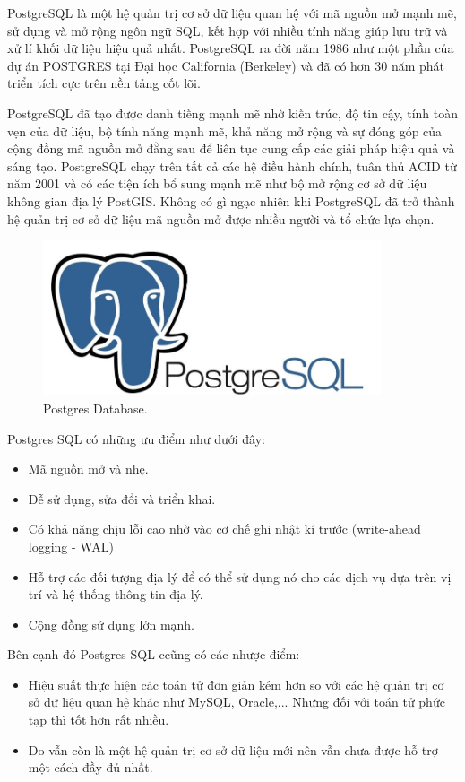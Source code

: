 PostgreSQL là một hệ quản trị cơ sở dữ liệu quan hệ với mã nguồn mở mạnh mẽ, sử dụng và mở rộng ngôn ngữ SQL, kết hợp với nhiều tính năng giúp lưu trữ và xử lí khối dữ liệu hiệu quả nhất. PostgreSQL ra đời năm 1986 như một phần của dự án POSTGRES tại Đại học California (Berkeley) và đã có hơn 30 năm phát triển tích cực trên nền tảng cốt lõi.\par

PostgreSQL đã tạo được danh tiếng mạnh mẽ nhờ kiến trúc, độ tin cậy, tính toàn vẹn của dữ liệu, bộ tính năng mạnh mẽ, khả năng mở rộng và sự đóng góp của cộng đồng mã nguồn mở đằng sau để liên tục cung cấp các giải pháp hiệu quả và sáng tạo. PostgreSQL chạy trên tất cả các hệ điều hành chính, tuân thủ ACID từ năm 2001 và có các tiện ích bổ sung mạnh mẽ như bộ mở rộng cơ sở dữ liệu không gian địa lý PostGIS. Không có gì ngạc nhiên khi PostgreSQL đã trở thành hệ quản trị cơ sở dữ liệu mã nguồn mở được nhiều người và tổ chức lựa chọn.\par

 \begin{figure}[h!]
    \begin{center}
        \includegraphics[width=10cm]{Image/Technical/postgresql.png}
        \caption{Postgres Database.}
        \label{postgres}
    \end{center}
\end{figure}

\par
Postgres SQL có những ưu điểm như dưới đây:
\begin{itemize}
    \item Mã nguồn mở và nhẹ.
    \item Dễ sử dụng, sửa đổi và triển khai.
    \item Có khả năng chịu lỗi cao nhờ vào cơ chế ghi nhật kí trước (write-ahead logging - WAL)
    \item Hỗ trợ các đối tượng địa lý để có thể sử dụng nó cho các dịch vụ dựa trên vị trí và hệ thống thông tin địa lý.
    \item Cộng đồng sử dụng lớn mạnh.
\end{itemize}
Bên cạnh đó Postgres SQL ccũng có các nhược điểm:
\begin{itemize}
    \item Hiệu suất thực hiện các toán tử đơn giản kém hơn so với các hệ quản trị cơ sở dữ liệu quan hệ khác như MySQL, Oracle,... Nhưng đối với toán tử phức tạp thì tốt hơn rất nhiều.
    \item Do vẫn còn là một hệ quản trị cơ sở dữ liệu mới nên vẫn chưa được hỗ trợ một cách đầy đủ nhất.
\end{itemize}